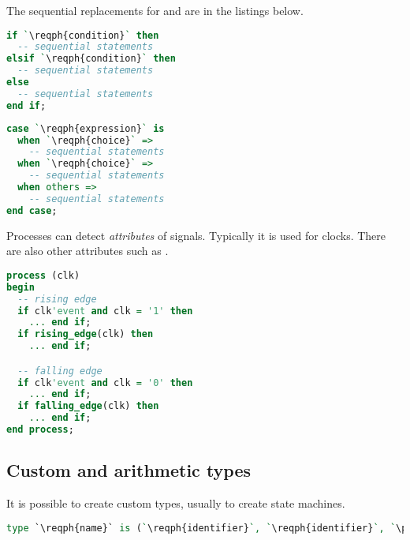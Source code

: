 The sequential replacements for  and  are in the listings below.
\begin{lstlisting}[language=vhdl]
if `\reqph{condition}` then
  -- sequential statements 
elsif `\reqph{condition}` then
  -- sequential statements 
else
  -- sequential statements 
end if;
\end{lstlisting}
\begin{lstlisting}[language=vhdl]
case `\reqph{expression}` is
  when `\reqph{choice}` =>
    -- sequential statements
  when `\reqph{choice}` =>
    -- sequential statements
  when others =>
    -- sequential statements
end case;
\end{lstlisting}

Processes can detect \emph{attributes} of signals. Typically it is used for
clocks. There are also other attributes such as .
\begin{lstlisting}[language=vhdl]
process (clk)
begin
  -- rising edge
  if clk'event and clk = '1' then
    ... end if;
  if rising_edge(clk) then
    ... end if;

  -- falling edge
  if clk'event and clk = '0' then
    ... end if;
  if falling_edge(clk) then
    ... end if;
end process;
\end{lstlisting}

\subsection{Custom and arithmetic types}
It is possible to create custom types, usually to create state machines.
\begin{lstlisting}[language=vhdl]
type `\reqph{name}` is (`\reqph{identifier}`, `\reqph{identifier}`, `\ph{\ldots}`);
\end{lstlisting}

